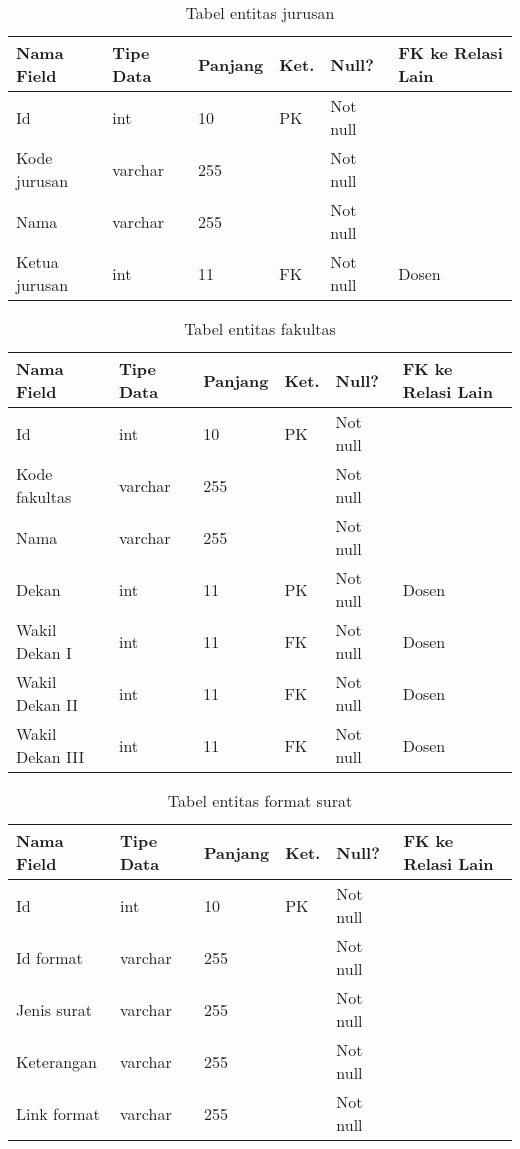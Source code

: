 \begin{table}[H]
\centering
\caption{Tabel entitas jurusan}
\label{entitas_jurusan}
\begin{tabular}{|l|l|l|l|l|l|}
\hline
\textbf{Nama Field}&\textbf{Tipe Data}&\textbf{Panjang}&\textbf{Ket.}&\textbf{Null?}&\textbf{FK ke Relasi Lain}\\ \hline
Id&int&10&PK&Not null&\\ \hline
Kode jurusan&varchar&255&&Not null&\\ \hline
Nama&varchar&255&&Not null&\\ \hline
Ketua jurusan&int&11&FK&Not null&Dosen\\ \hline
\end{tabular}
\end{table}

\begin{table}[H]
\centering
\caption{Tabel entitas fakultas}
\label{entitas_fakultas}
\begin{tabular}{|l|l|l|l|l|l|}
\hline
\textbf{Nama Field}&\textbf{Tipe Data}&\textbf{Panjang}&\textbf{Ket.}&\textbf{Null?}&\textbf{FK ke Relasi Lain}\\ \hline
Id&int&10&PK&Not null&\\ \hline
Kode fakultas&varchar&255&&Not null&\\ \hline
Nama&varchar&255&&Not null&\\ \hline
Dekan&int&11&PK&Not null&Dosen\\ \hline
Wakil Dekan I&int&11&FK&Not null&Dosen\\ \hline
Wakil Dekan II&int&11&FK&Not null&Dosen\\ \hline
Wakil Dekan III&int&11&FK&Not null&Dosen\\ \hline\end{tabular}
\end{table}

\begin{table}[H]
\centering
\caption{Tabel entitas format surat}
\label{entitas_format_surat}
\begin{tabular}{|l|l|l|l|l|l|}
\hline
\textbf{Nama Field}&\textbf{Tipe Data}&\textbf{Panjang}&\textbf{Ket.}&\textbf{Null?}&\textbf{FK ke Relasi Lain}\\ \hline
Id&int&10&PK&Not null&\\ \hline
Id format&varchar&255&&Not null&\\ \hline
Jenis surat&varchar&255&&Not null&\\ \hline
Keterangan&varchar&255&&Not null&\\ \hline
Link format&varchar&255&&Not null&\\ \hline
\end{tabular}
\end{table}

